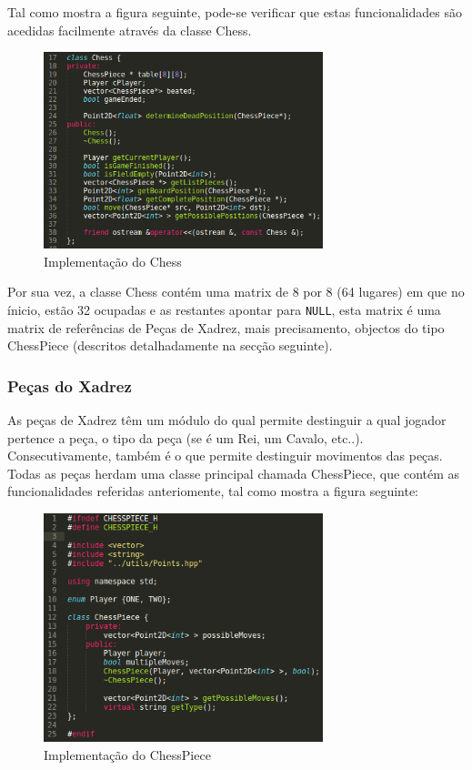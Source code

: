 \documentclass[portugues,final]{revdetua}
\begin{document}
Tal como mostra a figura seguinte, pode-se verificar que estas funcionalidades são acedidas facilmente através da classe Chess.

\begin{figure}[H]
\centerline{\includegraphics[width=230pt]{images/chess.png}}
\caption{Implementação do Chess}
\label{img:complete}
\end{figure}

Por sua vez, a classe Chess contém uma matrix de 8 por 8 (64 lugares) em que no ínicio, estão 32 ocupadas e as restantes apontar para {\tt NULL}, esta matrix é uma matrix de referências de Peças de Xadrez, mais precisamento, objectos do tipo ChessPiece (descritos detalhadamente na secção seguinte).

\subsubsection{Peças do Xadrez}

As peças de Xadrez têm um módulo do qual permite destinguir a qual jogador pertence a peça, o tipo da peça (se é um Rei, um Cavalo, etc..). Consecutivamente, também é o que permite destinguir movimentos das peças.\\

Todas as peças herdam uma classe principal chamada ChessPiece, que contém as funcionalidades referidas anteriomente, tal como mostra a figura seguinte:

\begin{figure}[H]
\centerline{\includegraphics[width=230pt]{images/chesspiece.png}}
\caption{Implementação do ChessPiece}
\label{img:complete}
\end{figure}
\end{document}
